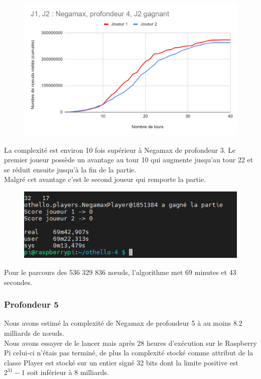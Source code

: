 \documentclass[12pt]{article}
\begin{document}
\begin{figure}[!h]
   \includegraphics[width=\textwidth]{prof4negamax.png}
\end{figure}

La complexité est environ 10 fois supérieur à Negamax de profondeur 3. Le premier joueur possède un avantage au tour 10 qui augmente jusqu’au tour 22 et se réduit ensuite jusqu’à la fin de la partie.\\
Malgré cet avantage c’est le second joueur qui remporte la partie.

\begin{figure}[!h]
   \includegraphics[width=\textwidth]{prof4negamax-console.png}
\end{figure}

Pour le parcours des 536 329 836 nœuds, l’algorithme met 69 minutes et 43 secondes. 

\subsubsection{Profondeur 5}

Nous avons estimé la complexité de Negamax de profondeur 5 à au moins 8.2 milliards de nœuds.\\
Nous avons essayer de le lancer mais après 28 heures d’exécution sur le Raspberry Pi celui-ci n’étais pas terminé, de plus la complexité stocké comme attribut de la classe Player est stocké sur un entier signé 32 bits dont la limite positive est $2^{31} - 1$ soit inférieur à 8 milliards.
\end{document}
